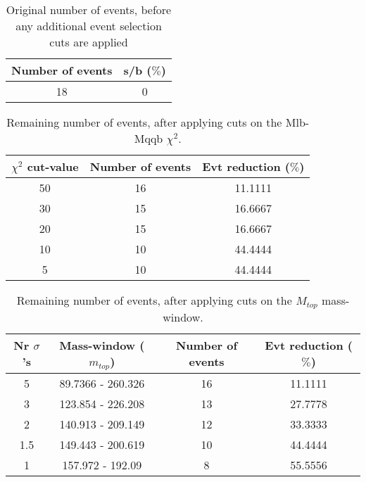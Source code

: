 \documentclass{article}
\begin{document}
 

 \begin{abstract} 
 
   The tables in this document represent the influence of the additional event selection cuts that were applied in order to reduce the number of selected events for CPU reasons. \\ 
   The considered cuts are rather basic and are merely developed to reduce the number of so-called wrong events \\ 
   \begin{itemize} 
     \item Cut on Mlb-Mqqb $\chi^{2}$ distribution 
     \item Cut on top and W-mass window 
   \end{itemize} 
 
   \textbf{Created on :} \today 
 \end{abstract} 
 
 \begin{table}[h!t] 
  \caption{Original number of events, before any additional event selection cuts are applied} 
  \centering 
   \begin{tabular}{c|c} 
     Number of events    & s/b ($\%$)     \\ 
     \hline
     18  & 0 
 
   \end{tabular} 
 \end{table} 
 
 \begin{table}[h!t] 
  \caption{Remaining number of events, after applying cuts on the Mlb-Mqqb $\chi^{2}$.} 
  \centering 
   \begin{tabular}{c|c|c|} 
     $\chi^{2}$ cut-value    & Number of events  & Evt reduction ($\%$)    \\ 
     \hline
     50  &   16  &  11.1111 \\ 
     30  &   15  &  16.6667 \\ 
     20  &   15  &  16.6667 \\ 
     10  &   10  &  44.4444 \\ 
     5  &   10  &  44.4444 \\ 
   \end{tabular} 
 \end{table} 
 
 \begin{table}[h!t] 
  \caption{Remaining number of events, after applying cuts on the $M_{top}$ mass-window.} 
  \centering 
   \begin{tabular}{c|c|c|c|}
     Nr $\sigma$'s & Mass-window ($m_{top}$)   & Number of events   & Evt reduction ($\%$)     \\
     \hline
     5 & 89.7366 - 260.326  &   16 &  11.1111 \\ 
     3 & 123.854 - 226.208  &   13 &  27.7778 \\ 
     2 & 140.913 - 209.149  &   12 &  33.3333 \\ 
     1.5 & 149.443 - 200.619  &   10 &  44.4444 \\ 
     1 & 157.972 - 192.09  &   8 &  55.5556 \\ 
   \end{tabular} 
 \end{table} 
 
\end{document}
